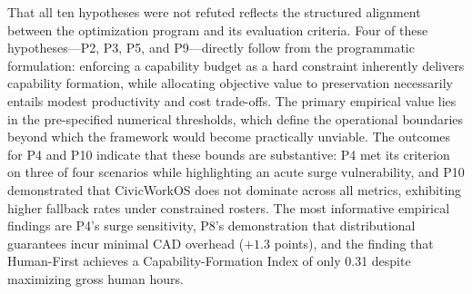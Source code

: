 	That all ten hypotheses were not refuted reflects the structured alignment between the optimization program and its evaluation criteria. Four of these hypotheses---P2, P3, P5, and P9---directly follow from the programmatic formulation: enforcing a capability budget as a hard constraint inherently delivers capability formation, while allocating objective value to preservation necessarily entails modest productivity and cost trade-offs. The primary empirical value lies in the pre-specified numerical thresholds, which define the operational boundaries beyond which the framework would become practically unviable. The outcomes for P4 and P10 indicate that these bounds are substantive: P4 met its criterion on three of four scenarios while highlighting an acute surge vulnerability, and P10 demonstrated that CivicWorkOS does not dominate across all metrics, exhibiting higher fallback rates under constrained rosters. The most informative empirical findings are P4's surge sensitivity, P8's demonstration that distributional guarantees incur minimal CAD overhead ($+1.3$ points), and the finding that Human-First achieves a Capability-Formation Index of only 0.31 despite maximizing gross human hours.
	
	\FloatBarrier
	
